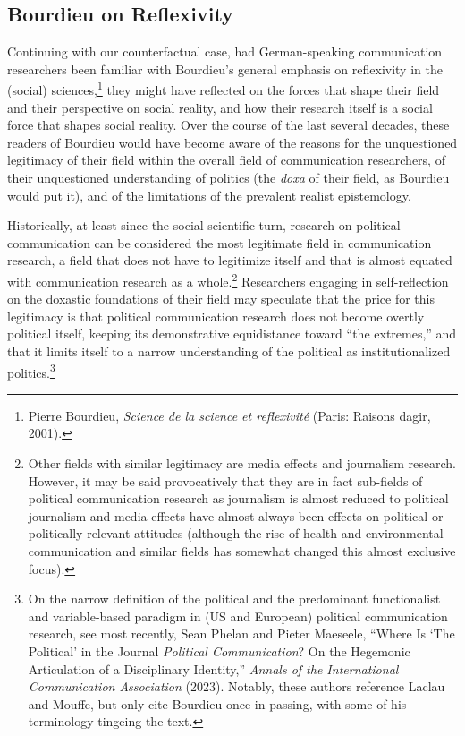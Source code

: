 \documentclass{tufte-handout}
\begin{document}
\hypertarget{bourdieu-on-reflexivity}{%
\subsection{Bourdieu on
Reflexivity}\label{bourdieu-on-reflexivity}}

Continuing with our counterfactual case, had German-speaking
communication researchers been familiar with Bourdieu's general emphasis
on reflexivity in the (social) sciences,\footnote{Pierre Bourdieu,
  \emph{Science de la science et reflexivité} (Paris: Raisons
  d\textquotesingle agir, 2001).} they might have reflected on the
forces that shape their field and their perspective on social reality,
and how their research itself is a social force that shapes social
reality. Over the course of the last several decades, these readers of
Bourdieu would have become aware of the reasons for the unquestioned
legitimacy of their field within the overall field of communication
researchers, of their unquestioned understanding of politics (the
\emph{doxa} of their field, as Bourdieu would put it), and of the
limitations of the prevalent realist epistemology.

Historically, at least since the social-scientific turn, research on
political communication can be considered the most legitimate field in
communication research, a field that does not have to legitimize itself
and that is almost equated with communication research as a
whole.\footnote{Other fields with similar legitimacy are media effects
  and journalism research. However, it may be said provocatively that
  they are in fact sub-fields of political communication research as
  journalism is almost reduced to political journalism and media effects
  have almost always been effects on political or politically relevant
  attitudes (although the rise of health and environmental communication
  and similar fields has somewhat changed this almost exclusive focus).}
Researchers engaging in self-reflection on the doxastic foundations of
their field may speculate that the price for this legitimacy is that
political communication research does not become overtly political
itself, keeping its demonstrative equidistance toward ``the extremes,''
and that it limits itself to a narrow understanding of the political as
institutionalized politics.\footnote{On the narrow definition of the
  political and the predominant functionalist and variable-based
  paradigm in (US and European) political communication research, see
  most recently, Sean Phelan and Pieter Maeseele, ``Where Is `The
  Political' in the Journal \emph{Political Communication}? On the
  Hegemonic Articulation of a Disciplinary Identity,'' \emph{Annals of
  the International Communication Association} (2023). Notably, these
  authors reference Laclau and Mouffe, but only cite Bourdieu once in
  passing, with some of his terminology tingeing the text.}
\end{document}
